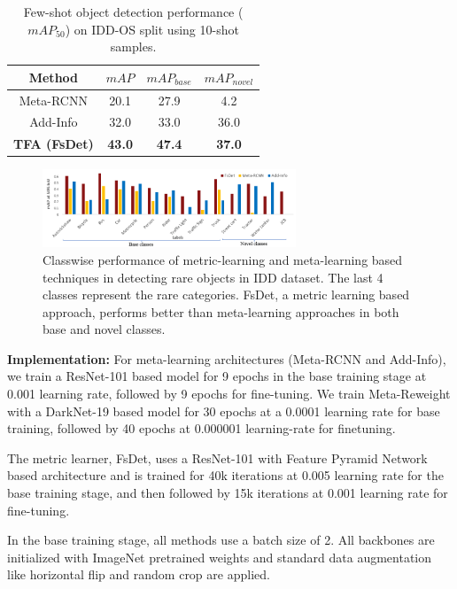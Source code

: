 \documentclass[letterpaper]{article} %
\begin{document}
\begin{table}[t]
\caption{Few-shot object detection performance ($mAP_{50}$) on IDD-OS split using 10-shot samples.}
\centering
\begin{tabular}{c|c|c|c}
\hline
Method                   & $mAP$  & $mAP_{base}$ & $mAP_{novel}$ \\
\hline
Meta-RCNN & 20.1 & 27.9         & 4.2           \\
Add-Info  & 32.0 & 33.0         & 36.0          \\
\textbf{TFA (FsDet)} & \textbf{43.0} & \textbf{47.4} & \textbf{37.0}          \\
\hline
\end{tabular}
\label{table4}
\end{table}

\begin{figure}[t]
\centering
\includegraphics[height=0.17\textwidth,width=0.675\textwidth]{accuracy_vfb.PNG}
\caption{Classwise performance of metric-learning and meta-learning based techniques in detecting rare objects in IDD dataset. The last 4 classes represent the rare categories. FsDet, a metric learning based approach, performs better than meta-learning approaches in both base and novel classes.}
\label{vfb_classwise}
\end{figure}

\textbf{Implementation: }
For meta-learning architectures (Meta-RCNN and Add-Info), we train a ResNet-101 based model for 9 epochs in the base training stage at 0.001 learning rate, followed by 9 epochs for fine-tuning. We train Meta-Reweight with a DarkNet-19 based model for 30 epochs at a 0.0001 learning rate for base training, followed by 40 epochs at 0.000001 learning-rate for finetuning.

The metric learner, FsDet, uses a ResNet-101 with Feature Pyramid Network based architecture and is trained for 40k iterations at 0.005 learning rate for the base training stage, and then followed by 15k iterations at 0.001 learning rate for fine-tuning.

In the base training stage, all methods use a batch size of 2. All backbones are initialized with ImageNet pretrained weights and standard data augmentation like horizontal flip and random crop are applied.
\end{document}
